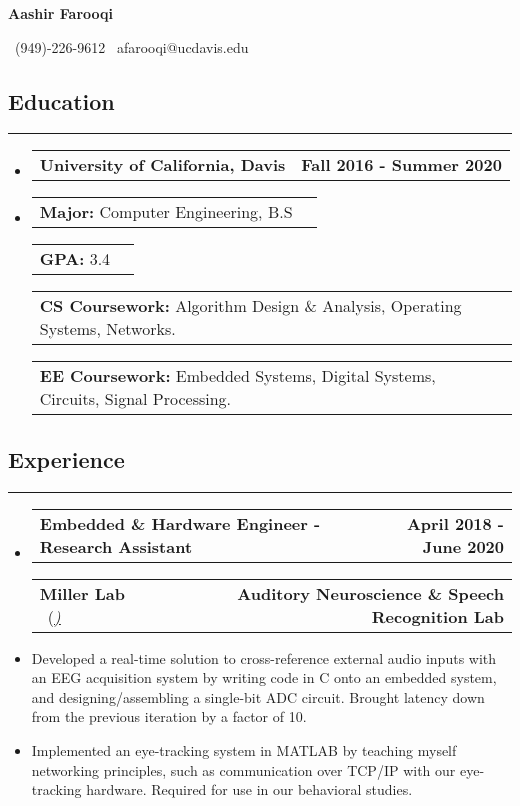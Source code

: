\documentclass[10pt,letterpaper]{article}
\makeatletter
\newcommand{\items}[2]
{
	\begin{tabular*}{\linewidth}{l @{\extracolsep{\fill}} r}
		#1 & #2 \\
	\end{tabular*}
}
\newcommand{\header}[2]
{
	\begin{tabular*}{\linewidth}{l @{\extracolsep{\fill}} r}
		\hspace{-27pt} #1 & #2 \\
	\end{tabular*}
}
\newcommand{\sectionbreak}
{
	\vspace{-1.2em}
	\rule{\textwidth}{1.7pt}
	\vspace{-1.7em}
}
\makeatother
\begin{document}
\begin{center}
{\LARGE \textbf{Aashir Farooqi}}

\vspace{0.5em}
\ (949)-226-9612 \textbar 
\ afarooqi@ucdavis.edu\textbar
\ \href{https://github.com/AashPointO}{\emph{\underline{}}}
\\
\end{center}
\vspace{-20pt}


\subsection*{Education}
\sectionbreak

\begin{itemize}

\item[] 
	\header
		{\textbf{University of California, Davis}}
		{\textbf{Fall 2016 - Summer 2020}}
\item[]
	\vspace{-2.5pt}
	\items
		{\textbf{Major:} Computer Engineering, B.S}
		{}
	\items
		{\textbf{GPA:} 3.4}
		{}
	\items
		{\textbf{CS Coursework:} Algorithm Design \& Analysis, Operating Systems, Networks.}
		{}
	\items
		{\textbf{EE Coursework:} Embedded Systems, Digital Systems, Circuits, Signal Processing.}
		{}
{\vspace{-0.6em}}
	
\end{itemize}

\vspace{-24.65pt}

\subsection*{Experience}
\sectionbreak

\begin{itemize}
	\item[]
		\header
			{\textbf{Embedded \& Hardware Engineer - Research Assistant}} 
			{\textbf{April 2018 - June 2020}}
		\header
		{\textbf{Miller Lab} \ (\href{https://millerlab.faculty.ucdavis.edu}{\small \emph{\underline{\smash{millerlab.faculty.ucdavis.edu})}}} }
			{\textbf{Auditory Neuroscience \& Speech Recognition Lab}} 
		\item
			Developed a real-time solution to cross-reference external audio inputs with an EEG acquisition system
			by writing code in C onto an embedded system, and designing/assembling a single-bit ADC circuit. Brought latency down from the previous iteration by a factor of 10.
		\item 
			Implemented an eye-tracking system in MATLAB by teaching myself networking principles, such as communication over TCP/IP with our eye-tracking hardware. Required for use in our behavioral studies.
\end{itemize}
\end{document}
